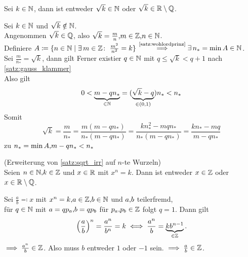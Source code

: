 \documentclass[../ana1.tex]{subfiles}
\begin{document}
\begin{satz}\label{satz:sqrt_irr}
	Sei \(k \in \mathbb{N} \), dann ist entweder \(\sqrt{k} \in \mathbb{N} \) oder \(\sqrt{k} \in \mathbb{R} \setminus \mathbb{Q} \).
\end{satz}
\begin{bew}
	Sei \(k \in \mathbb{N} \) und \(\sqrt{k} \notin \mathbb{N} \). \\
	Angenommen \(\sqrt{k} \in \mathbb{Q} \), also \(\sqrt{k} = \frac{m}{n} \text{,} m \in \mathbb{Z} \text{,} n \in \mathbb{N} \). \\
	Definiere \(A \coloneqq \{n \in \mathbb{N} \; \vert \; \exists \, m \in \mathbb{Z} \colon \; \frac{m^2}{n^2} = k\} \)
	\(\overset{\text{\autoref{satz:wohlordprinz}}}{\implies}\exists \, n_* = \min A \in \N \). \\
	Sei \(\frac{m}{n_*} = \sqrt{k} \), dann gilt
	Ferner existier \(q \in \mathbb{N} \) mit \(q \leq \sqrt{k} < q+1 \) nach \autoref{satz:gauss_klammer} \\
	Also gilt
	\[ 0 < \underbrace{m-qn_*}_{\in \mathbb{N}} = (\underbrace{\sqrt{k}-q}_{\in (0 \text{,} 1)})n_* < n_* \]
	Somit 
	\[ \sqrt{k} = \frac{m}{n_*} = \frac{m(m - qn_*)}{n_*(m - qn_*)} = \frac{kn_*^2 - mqn_*}{n_*(m - qn_*)}=\frac{kn_* - mq}{m - qn_*} \]
	\Lightning{} zu \(n_* = \min A \text{,} m-qn_* < n_* \)
\end{bew}

\iftoggle{short}{}{\newpage}%

\begin{bem}(Erweiterung von \autoref{satz:sqrt_irr} auf \(n \)-te Wurzeln) \leavevmode \\
	Seien \(n \in \mathbb{N} \text{,} k \in \mathbb{Z} \) und \(x \in \mathbb{R} \) mit \(x^n = k \). Dann ist entweder \(x \in \mathbb{Z} \) oder \(x \in \mathbb{R} \setminus \mathbb{Q} \).
\end{bem}
\begin{bew}
	Sei \(\frac{a}{b} \eqqcolon x \) mit \(x^n = k \text{,} a \in \mathbb{Z} \text{,} b \in \mathbb{N} \) und \(a \text{,} b\) teilerfremd, \\
	\dphp{} für \(q \in \mathbb{N} \) mit \(a = qp_a \text{,} b = qp_b \) für \(p_a \text{,} p_b \in \mathbb{Z} \) folgt \(q = 1 \).
	Dann gilt
	\[{\left(\frac{a}{b}\right)}^n = \frac{a^n}{b^n} = k \iff \frac{a^n}{b} = \underbrace{kb^{n - 1}}_{\in \mathbb{Z}}. \]
	\(\implies \frac{a^n}{b} \in \mathbb{Z} \). Also muss \(b \) entweder \(1 \) oder \(\minus 1 \) sein.
	\(\implies \frac{a}{b} \in \mathbb{Z} \).
\end{bew}
\end{document}
